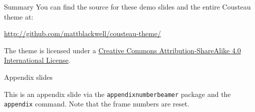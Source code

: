 \documentclass{beamer}
\begin{document}
\begin{frame}{Summary}
  You can find the source for these demo slides and the entire Cousteau theme at:
  \begin{center}
    \url{http://github.com/mattblackwell/cousteau-theme/}
  \end{center}

  The theme is licensed under a
  \href{http://creativecommons.org/licenses/by-sa/4.0/}{Creative Commons
  Attribution-ShareAlike 4.0 International License}.

  \begin{center}\ccbysa\end{center}

  
\end{frame}

\appendix

\begin{frame}{Appendix slides}

  This is an appendix slide via the \texttt{appendixnumberbeamer} package and the \texttt{\\appendix} command. Note that the frame numbers are reset. 
  
\end{frame}
\end{document}
